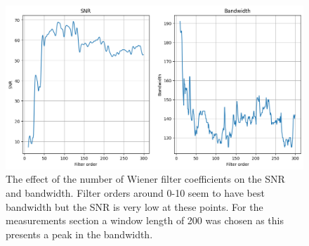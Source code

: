 \begin{figure}[h!t]
	\begin{center}
		\includegraphics[width=1.0\columnwidth]{images/wiener_filter_length.png}
	\end{center}
	\caption{The effect of the number of Wiener filter coefficients on the SNR and bandwidth. Filter orders around 0-10 seem to have best bandwidth but the SNR is very low at these points. For the measurements section a window length of 200 was chosen as this presents a peak in the bandwidth. }
	\label{fig:wiener_filter_length}
\end{figure}



